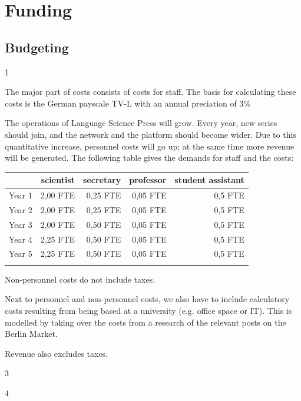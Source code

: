 \documentclass[output=guidelines,nonflat
]{langsci/langscibook}
\newcommand{\background}[1]{ 
  \vspace{5mm}
  \renewcommand{\tblslinecolour}{lsDarkBlue}
  \tblssy[red]{explore2}{Background}{#1}
}
\newcommand{\langscisolution}[1]{
  \renewcommand{\tblslinecolour}{lsLightBlue}
  \tblssy{langsci}{LangSci solution}{#1}
}
\newcommand{\evaluation}[1]{
  \renewcommand{\tblslinecolour}{lsLightOrange}
  \tblssy{receipt}{Evaluation}{#1}
}
\newcommand{\othersolutions}[1]{
  \renewcommand{\tblslinecolour}{lsDarkGreenOne}
  \tblssy{more}{Other solutions}{#1}
}
\renewcommand{\tblssy}[4][black!12]{%
  \renewcommand{\langscisymbol}{#2}\renewcommand{\tblsboxcolor}{#1}
  \begin{mdframed}[style=yellowexercise,frametitle={#3}]
    #4
  \end{mdframed}
}
\begin{document}
\chapter{Funding}

\section{Budgeting}

\background{1}
\langscisolution{
The major part of costs consists of costs for staff. The basis for calculating these costs is the German payscale TV-L with an annual preciation of 3\%

The operations of Language Science Press will grow. Every year, new series should join, and the network and the platform should become wider. Due to this quantitative increase, personnel costs will go up; at the same time more revenue will be generated. The following table gives the demands for staff and the costs: 

\noindent
\begin{tabularx}{\textwidth}{Xrrrr}
\lsptoprule
         &  scientist  & secretary &   professor &   student assistant  \\
\midrule
Year 1 &  2,00 FTE                 &    0,25 FTE                       &   0,05 FTE    &   0,5 FTE                  \\
Year 2 &  2,00 FTE                 &    0,25 FTE                       &   0,05 FTE    &   0,5 FTE                  \\
Year 3 &  2,00 FTE                 &    0,50 FTE                        &   0,05 FTE    &   0,5 FTE                  \\
Year 4 &  2,25 FTE              &    0,50 FTE                        &   0,05 FTE    &   0,5 FTE                  \\
Year 5 &  2,25 FTE              &    0,50 FTE                        &   0,05 FTE    &   0,5 FTE                  \\
\lspbottomrule
\end{tabularx}

Non-personnel costs do not include taxes. 

Next to personnel and non-personnel costs, we also have to include calculatory costs resulting from being based at a university (e.g. office space or IT). This is modelled by taking over the costs from a research of the relevant posts on the Berlin Market. 

Revenue also excludes taxes. 
}
\evaluation{3}
\othersolutions{4}
  
\end{document}
